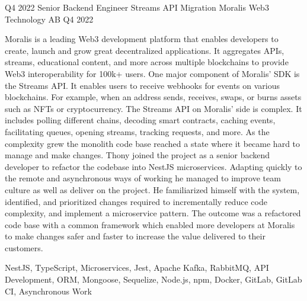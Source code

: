 \begin{experiences}
    \experience
    {Q4 2022}   
    {Senior Backend Engineer}
    {Streams API Migration}
    {Moralis Web3 Technology AB}
    {Q4 2022} {
    
        Moralis is a leading Web3 development platform that enables developers to create, launch and grow great decentralized applications. 
        It aggregates APIs, streams, educational content, and more across multiple blockchains to provide Web3 interoperability for 100k+ users.
        \newline \newline
        One major component of Moralis' SDK is the Streams API. 
        It enables users to receive webhooks for events on various blockchains. 
        For example, when an address sends, receives, swaps, or burns assets such as NFTs or cryptocurrency.
        \newline \newline
        The Streams API on Moralis' side is complex.
        It includes polling different chains, decoding smart contracts, caching events, facilitating queues, opening streams, tracking requests, and more.
        As the complexity grew the monolith code base reached a state where it became hard to manage and make changes.
        \newline \newline
        Thony joined the project as a senior backend developer to refactor the codebase into NestJS microservices.
        Adapting quickly to the remote and asynchronous ways of working he managed to improve team culture as well as deliver on the project.
        He familiarized himself with the system, identified, and prioritized changes required to incrementally reduce code complexity, and implement a microservice pattern. 
        The outcome was a refactored code base with a common framework which enabled more developers at Moralis to make changes safer and faster to increase the value delivered to their customers.
        \newline
    }
    {NestJS, TypeScript, Microservices, Jest, Apache Kafka, RabbitMQ, API
Development, ORM, Mongoose, Sequelize, Node.js, npm, Docker, GitLab, GitLab CI,
Asynchronous Work}
    \emptySeparator
    

\end{experiences}
